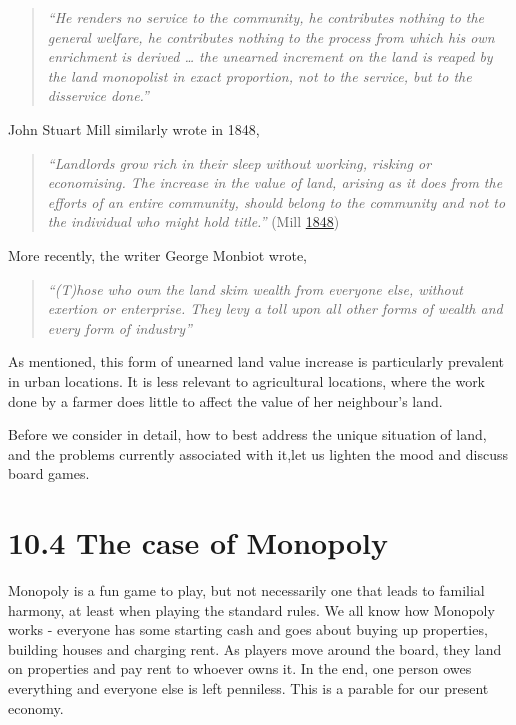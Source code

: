 \documentclass[]{tufte-handout}
\begin{document}
\begin{quote}
\emph{``He renders no service to the community, he contributes nothing
to the general welfare, he contributes nothing to the process from which
his own enrichment is derived \ldots{} the unearned increment on the
land is reaped by the land monopolist in exact proportion, not to the
service, but to the disservice done.''}
\end{quote}

John Stuart Mill similarly wrote in 1848,

\begin{quote}
\emph{``Landlords grow rich in their sleep without working, risking or
economising. The increase in the value of land, arising as it does from
the efforts of an entire community, should belong to the community and
not to the individual who might hold title.''} (Mill
\protect\hyperlink{ref-mill1848principles}{1848})
\end{quote}

More recently, the writer George Monbiot wrote,

\begin{quote}
\emph{``(T)hose who own the land skim wealth from everyone else, without
exertion or enterprise. They levy a toll upon all other forms of wealth
and every form of industry'' }
\end{quote}

As mentioned, this form of unearned land value increase is particularly
prevalent in urban locations. It is less relevant to agricultural
locations, where the work done by a farmer does little to affect the
value of her neighbour's land.

Before we consider in detail, how to best address the unique situation
of land, and the problems currently associated with it,let us lighten
the mood and discuss board games.

\hypertarget{the-case-of-monopoly}{%
\section{10.4 The case of Monopoly}\label{the-case-of-monopoly}}

Monopoly is a fun game to play, but not necessarily one that leads to
familial harmony, at least when playing the standard rules. We all know
how Monopoly works - everyone has some starting cash and goes about
buying up properties, building houses and charging rent. As players move
around the board, they land on properties and pay rent to whoever owns
it. In the end, one person owes everything and everyone else is left
penniless. This is a parable for our present economy.
\end{document}
